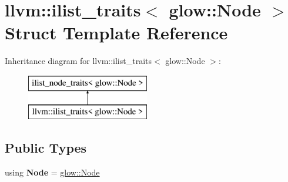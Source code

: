 \hypertarget{structllvm_1_1ilist__traits_3_01glow_1_1_node_01_4}{}\section{llvm\+:\+:ilist\+\_\+traits$<$ glow\+:\+:Node $>$ Struct Template Reference}
\label{structllvm_1_1ilist__traits_3_01glow_1_1_node_01_4}
Inheritance diagram for llvm\+:\+:ilist\+\_\+traits$<$ glow\+:\+:Node $>$\+:\begin{figure}[H]
\begin{center}
\leavevmode
\includegraphics[height=2.000000cm]{structllvm_1_1ilist__traits_3_01glow_1_1_node_01_4}
\end{center}
\end{figure}
\subsection*{Public Types}
\begin{DoxyCompactItemize}
\item 
\mbox{\label{structllvm_1_1ilist__traits_3_01glow_1_1_node_01_4_a495a1303c164c3121b1cb0c8d318c567}} 
using {\bfseries Node} = \hyperlink{classglow_1_1_node}{glow\+::\+Node}
\end{DoxyCompactItemize}
